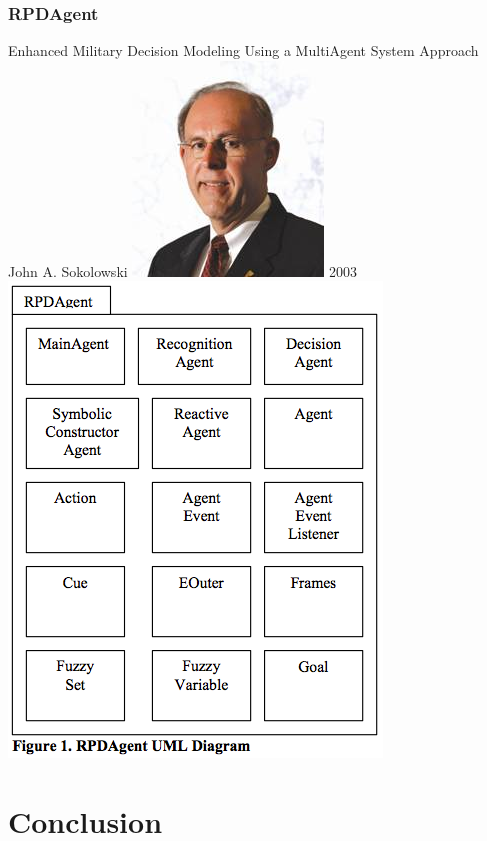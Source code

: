 \documentclass{article}
\begin{document}
\subsubsection{RPDAgent}
Enhanced Military Decision Modeling Using a MultiAgent System Approach
John A. Sokolowski
\includegraphics[scale=0.5]{../ressources/john_sokolowski}
2003
\includegraphics[height=0.7\paperheight]{../ressources/RPDagent_uml}
\cite{sokolowski2003}


\section{Conclusion}





\end{document}
